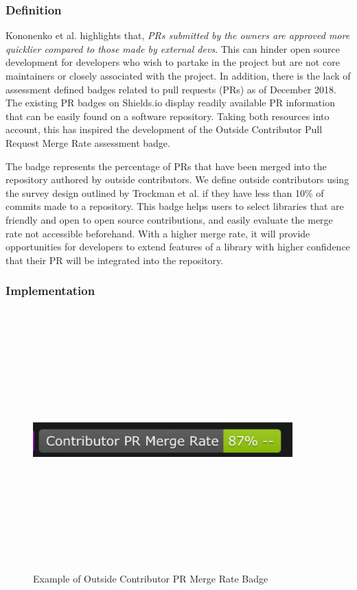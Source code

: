 \documentclass[12pt, letterpaper]{article}
\begin{document}
\subsubsection{Definition}
Kononenko et al. \cite{shopifyarticle} highlights that, \textit{PRs submitted by the owners are approved more
quicklier compared to those made by external devs}. This can hinder open source development
for developers who wish to partake in the project but are not core maintainers or closely associated with the project.
In addition, there is the lack of assessment defined badges \cite{githubbadges} related to pull requests (PRs)
as of December 2018.
The existing PR badges on Shields.io \cite{shields} display readily available PR information that can be easily found on a 
software repository. Taking both resources \cite{shields, shopifyarticle} into account, this has inspired
the development of the Outside Contributor Pull Request Merge Rate assessment badge. 


The badge represents the percentage of PRs that have been merged into the repository authored by outside contributors.
We define outside contributors using the survey design outlined by Trockman et al. \cite{githubbadges} if they have 
less than 10\% of commits made to a repository. 
This badge helps users to select libraries that are friendly and open to open source contributions,
and easily evaluate the merge rate not accessible beforehand.
With a higher merge rate, it will provide opportunities for developers to extend features of a library with 
higher confidence that their PR will be integrated into the repository.

\subsubsection{Implementation}

\begin{figure}[!htb]
    \centerline{
        \includegraphics[width=10cm,height=10cm,keepaspectratio=true]{prbadge}
    }
    \caption{
        Example of Outside Contributor PR Merge Rate Badge 
    }
    \label{prbadge}
\end{figure}
\end{document}
